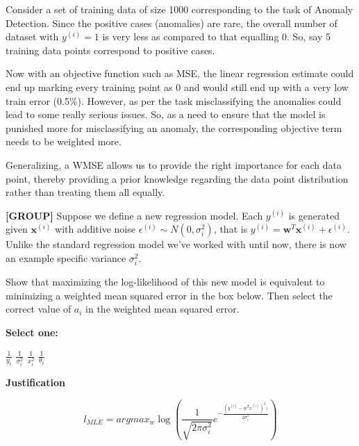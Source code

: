 \documentclass[11pt,addpoints,answers]{exam}
\newcommand{\group}{\textbf{[GROUP]} }
\begin{document}
\begin{questions}
    
    \begin{your_solution}[title=Your answer,height=10cm,width=15cm]
        Consider a set of training data of size 1000 corresponding to the task of Anomaly Detection. Since the positive cases (anomalies) are rare, the overall number of dataset with $y^{(i)} = 1$ is very less as compared to that equalling 0. So, say 5 training data points correspond to positive cases. 
        
        Now with an objective function such as MSE, the linear regression estimate could end up marking every training point as 0 and would still end up with a very low train error (0.5\%). However, as per the task misclassifying the anomalies could lead to some really serious issues. So, as a need to ensure that the model is punished more for misclassifying an anomaly, the corresponding objective term needs to be weighted more.\newline
        
        Generalizing, a WMSE allows us to provide the right importance for each data point, thereby providing a prior knowledge regarding the data point distribution rather than treating them all equally.
    \end{your_solution}
    
    
    \question[4]\group Suppose we define a new regression model. Each $y^{(i)}$ is generated given $\mathbf{x}^{(i)}$ with additive noise $\epsilon^{(i)} \sim N(0, \sigma_i^2)$, that is $y^{(i)} = \mathbf{w}^T \mathbf{x}^{(i)} + \epsilon^{(i)}$. Unlike the standard regression model we've worked with until now, there is now an example specific variance $\sigma_i^2$.
    
    Show that maximizing the log-likelihood of this new model is equivalent to minimizing a weighted mean squared error in the box below. Then select the correct value of $a_i$ in the weighted mean squared error.
    
    \textbf{Select one:}
    \begin{checkboxes}
        \choice $\frac{1}{y_i}$
        \CorrectChoice $\frac{1}{\sigma_i^2}$
        \choice $\frac{1}{x_i^2}$
        \choice $\frac{1}{\theta_i}$
    \end{checkboxes}
    \textbf{Justification}
    
    
    \begin{your_solution}[title=Justification,height=10cm,width=15cm]
    
    \[l_{MLE} = argmax_w \log(\frac{1}{\sqrt{2\pi\sigma_i^2}} e^{-\frac{(y^{(i)} - w^Tx^{(i)})^2)}{2\sigma_i^2}})\]
    

\end{your_solution}
\end{questions}
\end{document}
